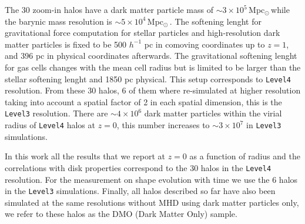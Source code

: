 \documentclass[a4paper,fleqn,usenatbib]{mnras}
\newcommand{\Msun}{\,{\rm Mpc}$_{\odot}$\,}
\begin{document}
The 30 zoom-in halos have a dark matter particle mass of $\sim 3\times
10^5$\Msun while the barynic mass resolution is $\sim 5\times 10^4$\Msun.
The softening lenght for gravitational force computation for stellar
particles and high-resolution dark matter particles 
is fixed to be 500 $h^{-1}$ pc in comoving coordinates up to $z=1$,
and 396 pc in physical coordinates afterwards.
The gravitational softening lenght for gas cells changes with the mean
cell radius but is limited to be larger than the stellar softening
lenght and 1850 pc physical. 
This setup corresponds to \texttt{Level4} resolution.
From these 30 halos, 6 of them where re-simulated at higher resolution
taking into account a spatial factor of 2 in each spatial dimension,
this is the \texttt{Level3} resolution.  
There are $\sim 4\times 10^6$ dark matter particles within the virial radius
of \texttt{Level4} halos at $z=0$, this number increases to $\sim 3\times 10^7$ in
\texttt{Level3} simulations. 
 
In this work all the results that we report at $z=0$ as a function of radius and
the correlations with disk properties correspond to the 30 halos in
the \texttt{Level4} resolution. 
For the measurement on shape evolution with time we use the 6 halos in
the \texttt{Level3} simulations.
Finally, all  halos described so far have also been simulated at the same
resolutions without MHD using dark matter particles only, we refer to
these halos as the DMO (Dark Matter Only) sample.
\end{document}
